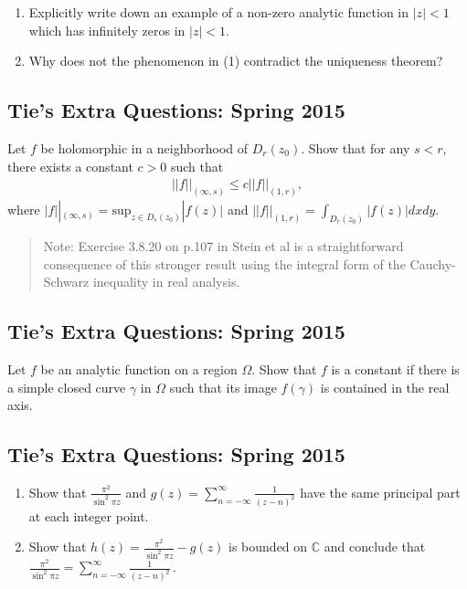\begin{enumerate}
\def\labelenumi{(\arabic{enumi})}
\item
  Explicitly write down an example of a non-zero analytic function in
  \(|z|<1\) which has infinitely zeros in \(|z|<1\).
\item
  Why does not the phenomenon in (1) contradict the uniqueness theorem?
\end{enumerate}

\hypertarget{ties-extra-questions-spring-2015-12}{%
\subsection{Tie's Extra Questions: Spring
2015}\label{ties-extra-questions-spring-2015-12}}

Let \(f\) be holomorphic in a neighborhood of \(D_r(z_0)\). Show that
for any \(s<r\), there exists a constant \(c>0\) such that
\begin{align*}||f||_{(\infty, s)} \leq c ||f||_{(1, r)},\end{align*}
where
\(\displaystyle |f||_{(\infty, s)} = \text{sup}_{z \in D_s(z_0)}|f(z)|\)
and \(\displaystyle ||f||_{(1, r)} = \int_{D_r(z_0)} |f(z)|dx dy\).

\begin{quote}
Note: Exercise 3.8.20 on p.107 in Stein et al is a straightforward
consequence of this stronger result using the integral form of the
Cauchy-Schwarz inequality in real analysis.
\end{quote}

\hypertarget{ties-extra-questions-spring-2015-13}{%
\subsection{Tie's Extra Questions: Spring
2015}\label{ties-extra-questions-spring-2015-13}}

Let \(f\) be an analytic function on a region \(\Omega\). Show that
\(f\) is a constant if there is a simple closed curve \(\gamma\) in
\(\Omega\) such that its image \(f(\gamma)\) is contained in the real
axis.

\hypertarget{ties-extra-questions-spring-2015-14}{%
\subsection{Tie's Extra Questions: Spring
2015}\label{ties-extra-questions-spring-2015-14}}

\begin{enumerate}
\def\labelenumi{(\arabic{enumi})}
\item
  Show that \(\displaystyle \frac{\pi^2}{\sin^2 \pi z}\) and
  \(\displaystyle g(z) = \sum_{n = - \infty}^{ \infty} \frac{1}{(z-n)^2}\)
  have the same principal part at each integer point.
\item
  Show that \(\displaystyle h(z) = \frac{\pi^2}{\sin^2 \pi z} - g(z)\)
  is bounded on \(\mathbb C\) and conclude that
  \(\displaystyle \frac{\pi^2}{\sin^2 \pi z} = \sum_{n = - \infty}^{ \infty} \frac{1}{(z-n)^2} \, .\)
\end{enumerate}

